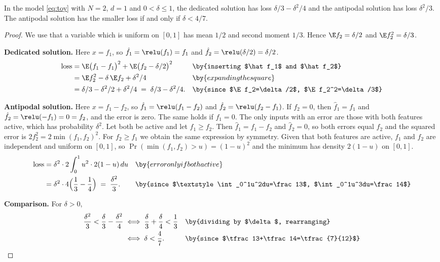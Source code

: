 \begin{proposition}\label{prop:toy}
In the model \eqref{eq:toy} with $N=2$, $d=1$ and $0<\delta\le1$, the dedicated solution has loss
$\delta/3-\delta^2/4$ and the antipodal solution has loss $\delta^2/3$. The antipodal solution has the smaller
loss if and only if $\delta<4/7$.
\end{proposition}
\begin{proof}
We use that a variable which is uniform on $[0,1]$ has mean $1/2$ and second moment $1/3$. Hence
$\E f_2=\delta/2$ and $\E f_2^2=\delta/3$.

\textbf{Dedicated solution.} Here $x=f_1$, so $\hat f_1=\relu(f_1)=f_1$ and $\hat f_2=\relu(\delta/2)=\delta/2$.
\begin{align*}
\text{loss} &= \E\big(f_1-f_1\big)^2+\E\big(f_2-\delta/2\big)^2 && \by{inserting $\hat f_1$ and $\hat f_2$}\\
&= \E f_2^2-\delta\,\E f_2+\delta^2/4 && \by{expanding the square}\\
&= \delta/3-\delta^2/2+\delta^2/4 \;=\; \delta/3-\delta^2/4. && \by{since $\E f_2=\delta/2$, $\E f_2^2=\delta/3$}
\end{align*}

\textbf{Antipodal solution.} Here $x=f_1-f_2$, so $\hat f_1=\relu(f_1-f_2)$ and $\hat f_2=\relu(f_2-f_1)$. If
$f_2=0$, then $\hat f_1=f_1$ and $\hat f_2=\relu(-f_1)=0=f_2$, and the error is zero. The same holds if $f_1=0$.
The only inputs with an error are those with both features active, which has probability $\delta^2$. Let both
be active and let $f_1\ge f_2$. Then $\hat f_1=f_1-f_2$ and $\hat f_2=0$, so both errors equal $f_2$ and the
squared error is $2f_2^2=2\min(f_1,f_2)^2$. For $f_2\ge f_1$ we obtain the same expression by symmetry. Given that
both features are active, $f_1$ and $f_2$ are independent and uniform on $[0,1]$, so
$\Pr(\min(f_1,f_2)>u)=(1-u)^2$ and the minimum has density $2(1-u)$ on $[0,1]$.
\begin{align*}
\text{loss} &= \delta^2\cdot 2\int_0^1u^2\cdot 2(1-u)\,du && \by{error only if both active}\\
&= \delta^2\cdot 4\Big(\frac13-\frac14\Big) \;=\; \frac{\delta^2}{3}. && \by{since $\textstyle\int_0^1u^2du=\frac13$, $\int_0^1u^3du=\frac14$}
\end{align*}

\textbf{Comparison.} For $\delta>0$,
\begin{align*}
\frac{\delta^2}{3}<\frac{\delta}{3}-\frac{\delta^2}{4}
\;&\Longleftrightarrow\; \frac{\delta}{3}+\frac{\delta}{4}<\frac13 && \by{dividing by $\delta$, rearranging}\\
&\Longleftrightarrow\; \delta<\frac47. && \by{since $\tfrac13+\tfrac14=\tfrac{7}{12}$}\qedhere
\end{align*}
\end{proof}

